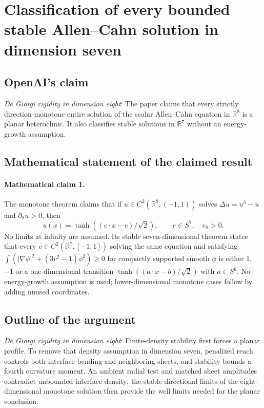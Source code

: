 \documentclass[11pt]{article}
\begin{document}
\section*{Classification of every bounded stable Allen–Cahn solution in dimension seven}

\subsection{OpenAI's claim}
\textit{De Giorgi rigidity in dimension eight}: The paper claims that every strictly direction-monotone entire solution of the scalar Allen--Cahn equation in $\mathbb R^8$ is a planar heteroclinic. It also classifies stable solutions in $\mathbb R^7$ without an energy-growth assumption.

\subsection{Mathematical statement of the claimed result}
\paragraph{Mathematical claim 1.} The monotone theorem claims that if $u\in C^2(\mathbb R^8,(-1,1))$ solves $\Delta u=u^3-u$ and $\partial_8u>0$, then \[u(x)=\tanh((e\cdot x-c)/\sqrt2),\qquad e\in S^7,\quad e_8>0.\] No limits at infinity are assumed. Its stable seven-dimensional theorem states that every $v\in C^2(\mathbb R^7,[-1,1])$ solving the same equation and satisfying $\int(|\nabla\phi|^2+(3v^2-1)\phi^2)\ge0$ for compactly supported smooth $\phi$ is either $1$, $-1$ or a one-dimensional transition $\tanh((a\cdot x-b)/\sqrt2)$ with $a\in S^6$. No energy-growth assumption is used; lower-dimensional monotone cases follow by adding unused coordinates.

\subsection{Outline of the argument}
\textit{De Giorgi rigidity in dimension eight}: Finite-density stability first forces a planar profile. To remove that density assumption in dimension seven, penalized reach controls both interface bending and neighboring sheets, and stability bounds a fourth curvature moment. An ambient radial test and matched sheet amplitudes contradict unbounded interface density; the stable directional limits of the eight-dimensional monotone solution then provide the well limits needed for the planar conclusion.
\end{document}
